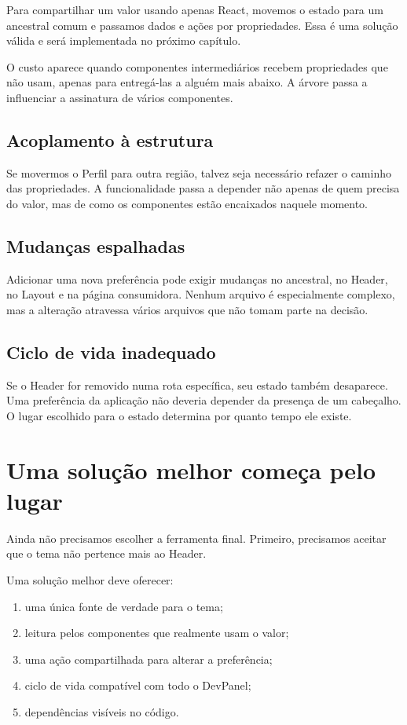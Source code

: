 Para compartilhar um valor usando apenas React, movemos o estado para um
ancestral comum e passamos dados e ações por propriedades. Essa é uma solução
válida e será implementada no próximo capítulo.

O custo aparece quando componentes intermediários recebem propriedades que não
usam, apenas para entregá-las a alguém mais abaixo. A árvore passa a influenciar
a assinatura de vários componentes.

\subsection{Acoplamento à estrutura}

Se movermos o Perfil para outra região, talvez seja necessário refazer o caminho
das propriedades. A funcionalidade passa a depender não apenas de quem precisa
do valor, mas de como os componentes estão encaixados naquele momento.

\subsection{Mudanças espalhadas}

Adicionar uma nova preferência pode exigir mudanças no ancestral, no Header, no
Layout e na página consumidora. Nenhum arquivo é especialmente complexo, mas a
alteração atravessa vários arquivos que não tomam parte na decisão.

\subsection{Ciclo de vida inadequado}

Se o Header for removido numa rota específica, seu estado também desaparece.
Uma preferência da aplicação não deveria depender da presença de um cabeçalho.
O lugar escolhido para o estado determina por quanto tempo ele existe.

\section{Uma solução melhor começa pelo lugar}

Ainda não precisamos escolher a ferramenta final. Primeiro, precisamos aceitar
que o tema não pertence mais ao Header.

Uma solução melhor deve oferecer:

\begin{enumerate}
  \item uma única fonte de verdade para o tema;
  \item leitura pelos componentes que realmente usam o valor;
  \item uma ação compartilhada para alterar a preferência;
  \item ciclo de vida compatível com todo o DevPanel;
  \item dependências visíveis no código.
\end{enumerate}

